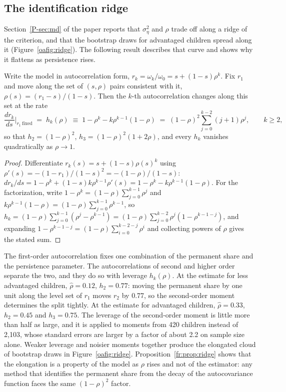 \subsection{The identification ridge}

Section~\ref{P-sec:md} of the paper reports that $\sigma^2_\eta$ and
$\rho$ trade off along a ridge of the criterion, and that the bootstrap
draws for advantaged children spread along it
(Figure~\ref{oafig:ridge}). The following result describes
that curve and shows why it flattens as persistence rises.

\begin{proposition}
\label{fr:prop:ridge}
Write the model in autocorrelation form,
$r_k = \omega_k/\omega_0 = s + (1-s)\rho^k$. Fix $r_1$ and move along the
set of $(s, \rho)$ pairs consistent with it,
$\rho(s) = (r_1 - s)/(1-s)$. Then the $k$-th autocorrelation changes
along this set at the rate
\begin{equation}
\frac{d r_k}{d s}\Big|_{r_1\ \mathrm{fixed}} \;=\; h_k(\rho) \;\equiv\; 1 - \rho^{k} - k\rho^{k-1}(1-\rho)
\;=\; (1-\rho)^2\sum_{j=0}^{k-2}(j+1)\rho^{j},
\qquad k \ge 2,
\label{fr:eq:hk}
\end{equation}
so that $h_2 = (1-\rho)^2$, $h_3 = (1-\rho)^2(1+2\rho)$, and every $h_k$
vanishes quadratically as $\rho \to 1$.
\end{proposition}

\begin{proof}
Differentiate $r_k(s) = s + (1-s)\rho(s)^k$ using
$\rho'(s) = -(1-r_1)/(1-s)^2 = -(1-\rho)/(1-s)$:
$dr_k/ds = 1 - \rho^k + (1-s)k\rho^{k-1}\rho'(s) = 1 - \rho^k - k\rho^{k-1}(1-\rho)$.
For the factorization, write $1 - \rho^k = (1-\rho)\sum_{j=0}^{k-1}\rho^j$
and $k\rho^{k-1}(1-\rho) = (1-\rho)\sum_{j=0}^{k-1}\rho^{k-1}$, so
$h_k = (1-\rho)\sum_{j=0}^{k-1}(\rho^j - \rho^{k-1}) = (1-\rho)\sum_{j=0}^{k-2}\rho^j(1-\rho^{k-1-j})$,
and expanding $1 - \rho^{k-1-j} = (1-\rho)\sum_{i=0}^{k-2-j}\rho^i$ and
collecting powers of $\rho$ gives the stated sum.
\end{proof}

The first-order autocorrelation fixes one combination of the permanent
share and the persistence parameter. The autocorrelations of second and
higher order separate the two, and they do so with leverage
$h_k(\rho)$. At the estimate for less advantaged children, $\hat\rho = 0.12$, $h_2 = 0.77$: moving the permanent share by one unit along the level set
of $r_1$ moves $r_2$ by 0.77, so the second-order moment determines the
split tightly. At the estimate for advantaged children,
$\hat\rho = 0.33$, $h_2 = 0.45$ and $h_3 = 0.75$. The leverage of the second-order moment is little more than half as large, and it is applied to moments from
420 children instead of 2,103, whose standard errors are larger by a
factor of about 2.2 on sample size alone. Weaker leverage and noisier
moments together produce the elongated cloud of bootstrap draws in
Figure~\ref{oafig:ridge}. Proposition~\ref{fr:prop:ridge}
shows that the elongation is a property of the model as $\rho$ rises and
not of the estimator: any method that identifies the permanent share
from the decay of the autocovariance function faces the same
$(1-\rho)^2$ factor.

